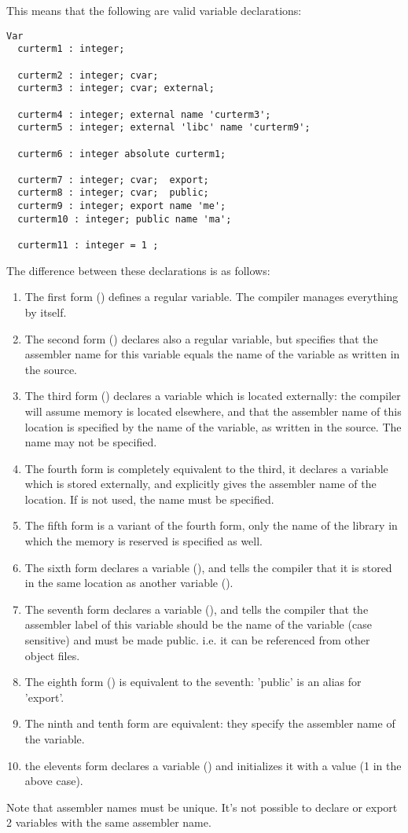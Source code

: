  
This means that the following are valid variable declarations:
 
\begin{verbatim}
Var
  curterm1 : integer;

  curterm2 : integer; cvar;
  curterm3 : integer; cvar; external;

  curterm4 : integer; external name 'curterm3';
  curterm5 : integer; external 'libc' name 'curterm9';

  curterm6 : integer absolute curterm1;

  curterm7 : integer; cvar;  export;
  curterm8 : integer; cvar;  public;
  curterm9 : integer; export name 'me';
  curterm10 : integer; public name 'ma';

  curterm11 : integer = 1 ;
\end{verbatim}

The difference between these declarations is as follows:
\begin{enumerate}
\item The first form () defines a regular variable. The
compiler manages everything by itself.
\item The second form () declares also a regular variable, 
but specifies that the assembler name for this variable equals the name 
of the variable as written in the source.
\item The third form () declares a variable which is located
externally: the compiler will assume memory is located elsewhere, and that
the assembler name of this location is specified by the name of the
variable, as written in the source. The name may not be specified.
\item The fourth form is completely equivalent to the third, it declares a
variable which is stored externally, and explicitly gives the assembler
name of the location. If  is not used, the name must be specified.
\item The fifth form is a variant of the fourth form, only the name of the
library in which the memory is reserved is specified as well.
\item The sixth form declares a variable (), and tells the compiler that it is
stored in the same location as another variable ().
\item The seventh form declares a variable (), and tells the
compiler that the assembler label of this variable should be the name of the
variable (case sensitive) and must be made public. i.e. it can be
referenced from other object files.
\item The eighth form () is equivalent to the seventh: 'public'
is an alias for 'export'.
\item The ninth and tenth form are equivalent: they specify the assembler 
name of the variable.
\item the elevents form declares a variable () and
initializes it with a value (1 in the above case).
\end{enumerate}
Note that assembler names must be unique. It's not possible to declare or 
export 2 variables with the same assembler name.

